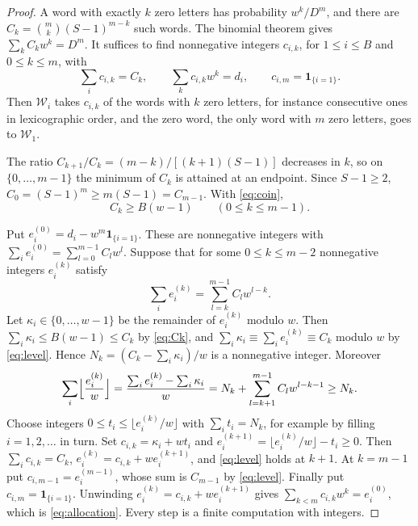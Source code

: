 \documentclass[11pt]{article}
\theoremstyle{plain}
\theoremstyle{definition}
\theoremstyle{remark}
\newcommand{\ind}{\mathbf 1}
\begin{document}
\begin{proof}
A word with exactly $k$ zero letters has probability $w^k/D^m$, and there are $C_k=\binom mk(S-1)^{m-k}$ such words. The binomial theorem gives $\sum_kC_kw^k=D^m$. It suffices to find nonnegative integers $c_{i,k}$, for $1\leq i\leq B$ and $0\leq k\leq m$, with
\begin{equation}\label{eq:allocation}
 \sum_ic_{i,k}=C_k,\qquad \sum_kc_{i,k}w^k=d_i,\qquad c_{i,m}=\ind_{\{i=1\}}.
\end{equation}
Then $\mathcal W_i$ takes $c_{i,k}$ of the words with $k$ zero letters, for instance consecutive ones in lexicographic order, and the zero word, the only word with $m$ zero letters, goes to $\mathcal W_1$.

The ratio $C_{k+1}/C_k=(m-k)/[(k+1)(S-1)]$ decreases in $k$, so on $\{0,\ldots,m-1\}$ the minimum of $C_k$ is attained at an endpoint. Since $S-1\geq2$, $C_0=(S-1)^m\geq m(S-1)=C_{m-1}$. With \eqref{eq:coin},
\begin{equation}\label{eq:Ck}
 C_k\geq B(w-1)\qquad(0\leq k\leq m-1).
\end{equation}

Put $e^{(0)}_i=d_i-w^m\ind_{\{i=1\}}$. These are nonnegative integers with $\sum_ie^{(0)}_i=\sum_{l=0}^{m-1}C_lw^l$. Suppose that for some $0\leq k\leq m-2$ nonnegative integers $e^{(k)}_i$ satisfy
\begin{equation}\label{eq:level}
 \sum_ie^{(k)}_i=\sum_{l=k}^{m-1}C_lw^{l-k}.
\end{equation}
Let $\kappa_i\in\{0,\ldots,w-1\}$ be the remainder of $e^{(k)}_i$ modulo $w$. Then $\sum_i\kappa_i\leq B(w-1)\leq C_k$ by \eqref{eq:Ck}, and $\sum_i\kappa_i\equiv\sum_ie^{(k)}_i\equiv C_k$ modulo $w$ by \eqref{eq:level}. Hence $N_k=(C_k-\sum_i\kappa_i)/w$ is a nonnegative integer. Moreover
\[
 \sum_i\Bigl\lfloor\frac{e^{(k)}_i}{w}\Bigr\rfloor=\frac{\sum_ie^{(k)}_i-\sum_i\kappa_i}{w}
 =N_k+\sum_{l=k+1}^{m-1}C_lw^{l-k-1}\geq N_k .
\]
Choose integers $0\leq t_i\leq\lfloor e^{(k)}_i/w\rfloor$ with $\sum_it_i=N_k$, for example by filling $i=1,2,\ldots$ in turn. Set $c_{i,k}=\kappa_i+wt_i$ and $e^{(k+1)}_i=\lfloor e^{(k)}_i/w\rfloor-t_i\geq0$. Then $\sum_ic_{i,k}=C_k$, $e^{(k)}_i=c_{i,k}+we^{(k+1)}_i$, and \eqref{eq:level} holds at $k+1$. At $k=m-1$ put $c_{i,m-1}=e^{(m-1)}_i$, whose sum is $C_{m-1}$ by \eqref{eq:level}. Finally put $c_{i,m}=\ind_{\{i=1\}}$. Unwinding $e^{(k)}_i=c_{i,k}+we^{(k+1)}_i$ gives $\sum_{k<m}c_{i,k}w^k=e^{(0)}_i$, which is \eqref{eq:allocation}. Every step is a finite computation with integers.
\end{proof}
\end{document}
